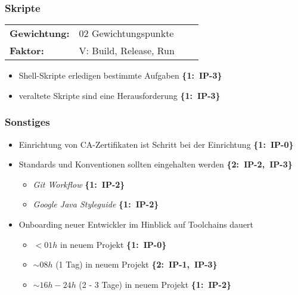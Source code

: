 \subsubsection{Skripte}
\label{subsubsec:AA-04-01-06_req-dev-scripts}

\vspace{0.5em}
\begin{tabular}{ll@{}ll@{}}
    \textbf{Gewichtung:}    &   02 Gewichtungspunkte    \\
    \textbf{Faktor:}        &   V: Build, Release, Run  \\
\end{tabular}

\begin{flushleft}
    \begin{itemize}
        \item Shell-Skripte erledigen bestimmte Aufgaben \mbox{\textbf{\{1: IP-3\}}}
        \item veraltete Skripte sind eine Herausforderung \mbox{\textbf{\{1: IP-3\}}}
    \end{itemize}
\end{flushleft}

\subsubsection{Sonstiges}
\label{subsubsec:AA-04-01-07_req-dev-miscellaneous}

\begin{flushleft}
    \begin{itemize}
        \item Einrichtung von CA-Zertifikaten ist Schritt bei der Einrichtung \mbox{\textbf{\{1: IP-0\}}}
        \item Standards und Konventionen sollten eingehalten werden \mbox{\textbf{\{2: IP-2, IP-3\}}}
        \begin{itemize}
            \item \textit{Git Workflow} \mbox{\textbf{\{1: IP-2\}}}
            \item \textit{Google Java Styleguide} \mbox{\textbf{\{1: IP-2\}}}
        \end{itemize}
        \item Onboarding neuer Entwickler im Hinblick auf Toolchains dauert
        \begin{itemize}
            \item $ < 01 h $ in neuem Projekt \mbox{\textbf{\{1: IP-0\}}}
            \item $ \sim 08 h $ (1 Tag) in neuem Projekt \mbox{\textbf{\{2: IP-1, IP-3\}}}
            \item $ \sim 16 h - 24 h $ (2 - 3 Tage) in neuem Projekt \mbox{\textbf{\{1: IP-2\}}}
        \end{itemize}
    \end{itemize}
\end{flushleft}

